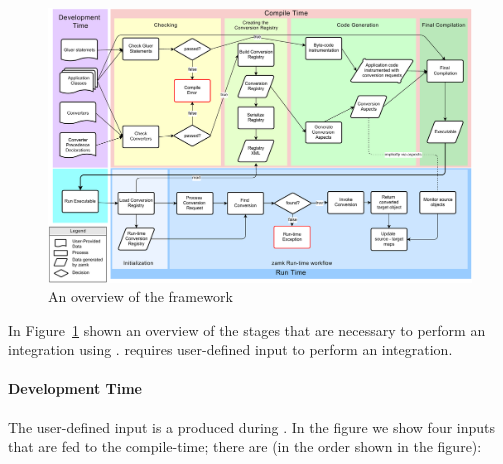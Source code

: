\begin{figure}
\includegraphics[height=\textwidth, angle=90]{chapteradapters/bigpicture.pdf}
\caption{An overview of the \zamk framework}
\label{fig:framework}
\end{figure}

In Figure~\ref{fig:framework} shown an overview of the stages that are necessary to perform an integration using \zamk.
\zamk requires user-defined input to perform an integration.

\paragraph{Development Time}
The user-defined input is a produced during . In the figure we show four inputs that are fed to the \zamk compile-time; there are (in the order shown in the figure):

